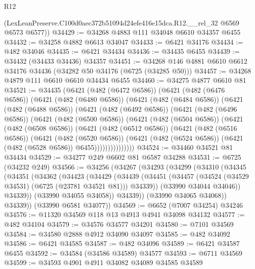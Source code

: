 \begin{lexlean}{R12}
\begin{coremodule}
      (LexLeanPreserve.C100d0aec372b51094d24efe416e15dca.R12.__rel_32 @6569 @6573 @6577))
@34429 := @34268 @4883 @111 @34048 @6610 @34357 @6455
@34432 := @34258 @4882 @6613 @34047
@34433 := @6421 @34176
@34434 := @482 @34046
@34435 := @6421 @34434
@34436 := @34435 @6455
@34439 := @34432 (@34433 @34436) @34357
@34451 := @34268 @146 @4881 @6610 @6612 @34176 @34436 (@34282 @50 @34176 (@6725 (@34285 @50)))
@34457 := @34268 @4879 @111 @6610 @6610 @34434 @6455
@34460 := @34275 @4877 @6610 @81
@34521 := @34435
    (@6421
      (@482 (@6472 @6586))
      (@6421
        (@482 (@6476 @6586))
        (@6421
          (@482 (@6480 @6586))
          (@6421
            (@482 (@6484 @6586))
            (@6421
              (@482 (@6488 @6586))
              (@6421
                (@482 (@6492 @6586))
                (@6421
                  (@482 (@6496 @6586))
                  (@6421
                    (@482 (@6500 @6586))
                    (@6421
                      (@482 (@6504 @6586))
                      (@6421
                        (@482 (@6508 @6586))
                        (@6421
                          (@482 (@6512 @6586))
                          (@6421
                            (@482 (@6516 @6586))
                            (@6421
                              (@482 (@6520 @6586))
                              (@6421
                                (@482 (@6524 @6586))
                                (@6421 (@482 (@6528 @6586)) @6455)))))))))))))))
@34524 := @34460 @34521 @81 @34434
@34529 := @34277 @249 @6602 @81 @6587 @34288
@34531 := @6725 (@34232 @249)
@34566 := @34256
    (@34267
      (@34293
        (@34299
          (@34310
            (@34345
              (@34351
                (@34362
                  (@34423
                    (@34429
                      (@34439
                        (@34451
                          (@34457 (@34524 (@34529 @34531) (@6725 (@23781 @34521 @81))) @34339))
                        (@33990 @34044 @34046))
                      @34339))
                  (@33990 @34055 @34058))
                @34339))
            (@33990 @34065 @34068))
          @34339))
      (@33990 @6581 @34077))
@34569 := @6652 (@7007 @34254) @34246
@34576 := @11320 @34569 @118 @13 @4913 @4941 @34098 @34132
@34577 := @482 @34104
@34579 := @34576 @34577 @34201
@34580 := @7101 @34569
@34584 := @34580 @2888 @4912 @34090 @34097
@34585 := @482 @34092
@34586 := @6421 @34585
@34587 := @482 @34096
@34589 := @6421 @34587 @6455
@34592 := @34584 (@34586 @34589) @34577
@34593 := @6711 @34569
@34599 := @34593 @4901 @4911 @34082 @34089 @34585 @34589

\end{coremodule}
\end{lexlean}
